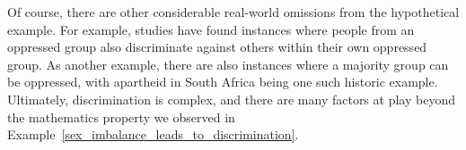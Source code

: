 Of course, there are other considerable real-world omissions
from the hypothetical example.
For example, studies have found instances where people from an
oppressed group also discriminate against others within their
own oppressed group.
As another example,
there are also instances where a majority group
can be oppressed, with apartheid in South Africa being one
such historic example.
Ultimately, discrimination is complex,
and there are many factors at play beyond
the mathematics property we observed in
Example~\ref{sex_imbalance_leads_to_discrimination}.

